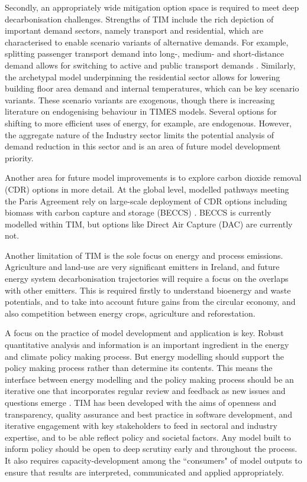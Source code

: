 \documentclass[gmd,manuscript]{copernicus}
\begin{document}
Secondly, an appropriately wide mitigation option space is required to meet deep decarbonisation challenges. Strengths of TIM include the rich depiction of important demand sectors, namely transport and residential, which are characterised to enable scenario variants of alternative demands. For example, splitting passenger transport demand into long-, medium- and short-distance demand allows for switching to active and public transport demands . Similarly, the archetypal model underpinning the residential sector allows for lowering building floor area demand and internal temperatures, which can be key scenario variants. These scenario variants are exogenous, though there is increasing literature on endogenising behaviour in TIMES models. Several options for shifting to more efficient uses of energy, for example, are endogenous. However, the aggregate nature of the Industry sector limits the potential analysis of demand reduction in this sector and is an area of future model development priority.

Another area for future model improvements is to explore carbon dioxide removal (CDR) options in more detail. At the global level, modelled pathways meeting the Paris Agreement rely on large-scale deployment of CDR options including biomass with carbon capture and storage (BECCS) \citep{IPCC2018}. BECCS is currently modelled within TIM, but options like Direct Air Capture (DAC)\citep{Realmonte2019} are currently not.

Another limitation of TIM is the sole focus on energy and process emissions. Agriculture and land-use are very significant emitters in Ireland, and future energy system decarbonisation trajectories will require a focus on the overlaps with other emitters. This is required firstly to understand bioenergy and waste potentials, and to take into account future gains from the circular economy, and also competition between energy crops, agriculture and reforestation.

A focus on the practice of model development and application is key. Robust quantitative analysis and information is an important ingredient in the energy and climate policy making process. But energy modelling should support the policy making process rather than determine its contents. This means the interface between energy modelling and the policy making process should be an iterative one that incorporates regular review and feedback as new issues and questions emerge \citep{Strachan2016}. TIM has been developed with the aims of openness and transparency, quality assurance and best practice in software development, and iterative engagement with key stakeholders to feed in sectoral and industry expertise, and to be able reflect policy and societal factors. Any model built to inform policy should be open to deep scrutiny early and throughout the process. It also requires capacity-development among the ``consumers" of model outputs to ensure that results are interpreted, communicated and applied appropriately.
\end{document}
